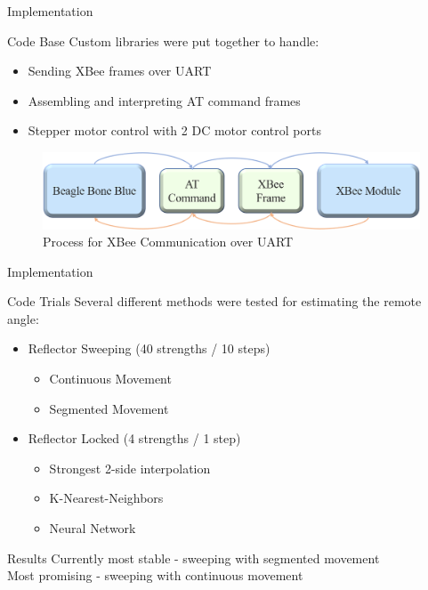 \documentclass{beamer}
\begin{document}
\begin{frame}{Implementation}
\begin{block}{Code Base}
  Custom libraries were put together to handle:
  \begin{itemize}
    \item Sending XBee frames over UART
    \item Assembling and interpreting AT command frames
    \item Stepper motor control with 2 DC motor control ports
  \end{itemize}
\end{block}
\begin{figure}
  \centering
  \includegraphics[width=\textwidth]{figs/img/Command Process Diagram.png}
  \caption{Process for XBee Communication over UART}
  \label{fig:CommandProcessDiagram}
\end{figure}
\end{frame}

\begin{frame}{Implementation}
\begin{block}{Code Trials}
Several different methods were tested for estimating the remote angle:
    \begin{itemize}
      \item Reflector Sweeping (40 strengths / 10 steps)
      \begin{itemize}
        \item Continuous Movement
        \item Segmented Movement
      \end{itemize}
      \item Reflector Locked (4 strengths / 1 step)
      \begin{itemize}
        \item Strongest 2-side interpolation
        \item K-Nearest-Neighbors
        \item Neural Network
      \end{itemize}
    \end{itemize}
\end{block}
\begin{block}{Results}
  Currently most stable - sweeping with segmented movement \\
  Most promising - sweeping with continuous movement
\end{block}
\end{frame}
\end{document}
